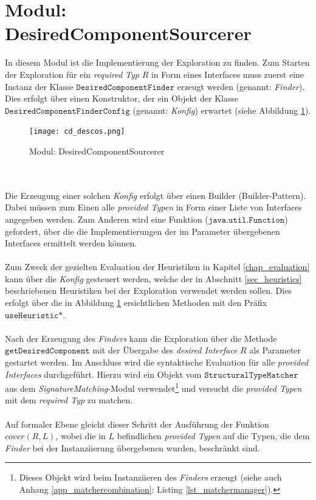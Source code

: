 \section{Modul: DesiredComponentSourcerer}\label{sec_impl_descos}
In diesem Modul ist die Implementierung der Exploration zu finden. Zum Starten der Exploration für ein \emph{required Typ} $R$ in Form eines Interfaces muss zuerst eine Instanz der Klasse $\texttt{DesiredComponentFinder}$ erzeugt werden (genannt: \emph{Finder}). Dies erfolgt über einen Konstruktor, der ein Objekt der Klasse $\texttt{DesiredComponentFinderConfig}$ (genannt: \emph{Konfig}) erwartet (siehe Abbildung \ref{cd_descos}). 
\begin{figure}[h!]
\centering
\texttt{[image: cd\_descos.png]}
\caption{Modul: DesiredComponentSourcerer}
\label{cd_descos}
\end{figure}
\noindent
\\\\
Die Erzeugung einer solchen \emph{Konfig} erfolgt über einen Builder (Builder-Pattern). Dabei müssen zum Einen alle \emph{provided Typen} in Form einer Liste von Interfaces angegeben werden. Zum Anderen wird eine Funktion ($\texttt{java.util.Function}$) gefordert, über die die Implementierungen der im Parameter übergebenen Interfaces ermittelt werden können.
\\\\
Zum Zweck der gezielten Evaluation der Heuristiken in Kapitel \ref{chap_evaluation} kann über die \emph{Konfig} gesteuert werden, welche der in Abschnitt \ref{sec_heuristics} beschriebenen Heuristiken bei der Exploration verwendet werden sollen. Dies erfolgt über die in Abbildung \ref{cd_descos} ersichtlichen Methoden mit den Präfix $\texttt{useHeuristic*}$.
\\\\
Nach der Erzeugung des \emph{Finders} kann die Exploration über die Methode $\texttt{getDesiredComponent}$ mit der Übergabe des \emph{desired Interface} $R$ als Parameter gestartet werden. Im Anschluss wird die syntaktische Evaluation für alle \emph{provided Interfaces} durchgeführt. Hierzu wird ein Objekt vom $\texttt{StructuralTypeMatcher}$ aus dem \emph{SignatureMatching}-Modul verwendet\footnote{Dieses Objekt wird beim Instanziieren des \emph{Finders} erzeugt (siehe auch Anhang \ref{app_matchercombination}: Listing \ref{lst_matchermanager}).} und versucht die \emph{provided Typen} mit dem \emph{required Typ} zu matchen.
\\\\
Auf formaler Ebene gleicht dieser Schritt der Ausführung der Funktion $\mathit{cover(R,L)}$, wobei die in $L$ befindlichen \emph{provided Typen} auf die Typen, die dem \emph{Finder} bei der Instanziierung übergebenen wurden, beschränkt sind.
